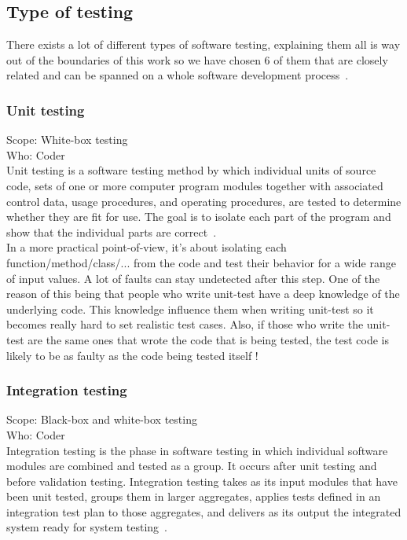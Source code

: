\documentclass[12pt]{article}
\begin{document}
\subsection{Type of testing}

There exists a lot of different types of software testing, explaining them all is way out of the boundaries of this work so we have chosen 6 of them that are closely related and can be spanned on a whole software development process~\cite{Laurie.W:Black-box}.

\subsubsection{Unit testing}

Scope: White-box testing\\
Who: Coder\\

Unit testing is a software testing method by which individual units of source code, sets of one or more computer program modules together with associated control data, usage procedures, and operating procedures, are tested to determine whether they are fit for use. The goal is to isolate each part of the program and show that the individual parts are correct~\cite{AutomatedDefectPrevention:2007}.\\

In a more practical point-of-view, it's about isolating each function/method/class/... from the code and test their behavior for a wide range of input values. A lot of faults can stay undetected after this step. One of the reason of this being that people who write unit-test have a deep knowledge of the underlying code. This knowledge influence them when writing unit-test so it becomes really hard to set realistic test cases. Also, if those who write the unit-test are the same ones that wrote the code that is being tested, the test code is likely to be as faulty as the code being tested itself !

\subsubsection{Integration testing}

Scope: Black-box and white-box testing\\
Who: Coder\\

Integration testing is the phase in software testing in which individual software modules are combined and tested as a group. It occurs after unit testing and before validation testing. Integration testing takes as its input modules that have been unit tested, groups them in larger aggregates, applies tests defined in an integration test plan to those aggregates, and delivers as its output the integrated system ready for system testing~\cite{TestingInSoftwareDevelopment:1987}.
\end{document}
